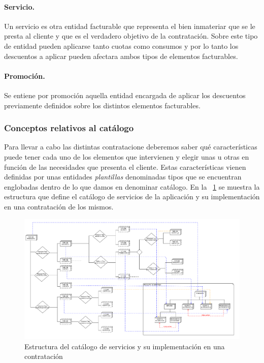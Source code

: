 \paragraph{Servicio.} Un servicio es otra entidad facturable que representa el bien inmateriar que se le presta al cliente y que es el verdadero objetivo de la contratación. Sobre este tipo de entidad pueden aplicarse tanto cuotas como consumos  y por lo tanto los descuentos a aplicar pueden afectara ambos tipos de elementos facturables.

\paragraph{Promoción.} Se entiene por promoción aquella entidad encargada de aplicar los descuentos previamente definidos sobre los distintos elementos facturables.



\subsubsection{Conceptos relativos al catálogo}
\label{sub:catálogo-conceptos}


Para llevar a cabo las distintas contratacione deberemos saber qué características puede tener cada uno de los elementos que intervienen y elegir unas u otras en función de las necesidades que presenta el cliente. Estas características vienen definidas por unas entidades \textit{plantillas} denominadas tipos que se encuentran englobadas dentro de lo que damos en denominar catálogo. En la \figurename~\ref{fig:estructura-catalogo} se muestra la estructura que define el catálogo de servicios de la aplicación y su implementación en una contratación de los mismos.

\begin{figure}[H]
  \centering
  \includegraphics[width=\textwidth]{imaxes/estructura-catalogo.png}
  \caption{Estructura del catálogo de servicios y su implementación en una contratación}
  \label{fig:estructura-catalogo}
\end{figure}


